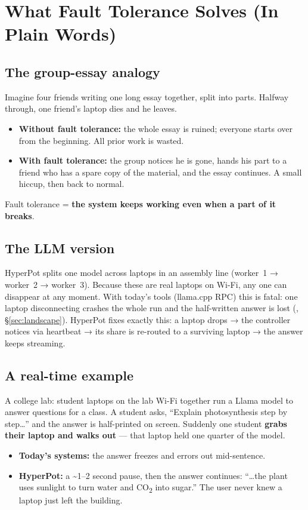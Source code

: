 \section{What Fault Tolerance Solves (In Plain Words)}
\label{sec:solves}

\subsection{The group-essay analogy}
Imagine four friends writing one long essay together, split into parts. Halfway
through, one friend's laptop dies and he leaves.
\begin{itemize}[leftmargin=1.4em,nosep]
  \item \textbf{Without fault tolerance:} the whole essay is ruined; everyone
  starts over from the beginning. All prior work is wasted.
  \item \textbf{With fault tolerance:} the group notices he is gone, hands his
  part to a friend who has a spare copy of the material, and the essay continues.
  A small hiccup, then back to normal.
\end{itemize}
Fault tolerance = \textbf{the system keeps working even when a part of it breaks}.

\subsection{The LLM version}
HyperPot splits one model across laptops in an assembly line (worker~1 →
worker~2 → worker~3). Because these are real laptops on Wi-Fi, any one can
disappear at any moment. With today's tools (llama.cpp RPC) this is fatal: one
laptop disconnecting crashes the whole run and the half-written answer is lost
(\VER, \S\ref{sec:landscape}). HyperPot fixes exactly this: a laptop drops →
the controller notices via heartbeat → its share is re-routed to a surviving
laptop → the answer keeps streaming.

\subsection{A real-time example}
 A college lab: student laptops on the lab Wi-Fi together run a
Llama model to answer questions for a class. A student asks, ``Explain
photosynthesis step by step\ldots'' and the answer is half-printed on screen.
Suddenly one student \textbf{grabs their laptop and walks out} --- that laptop
held one quarter of the model.
\begin{itemize}[leftmargin=1.4em,nosep]
  \item \textbf{Today's systems:} the answer freezes and errors out mid-sentence.
  \item \textbf{HyperPot:} a \textasciitilde1--2 second pause, then the answer
  continues: ``\ldots the plant uses sunlight to turn water and CO\textsubscript{2}
  into sugar.'' The user never knew a laptop just left the building.
\end{itemize}

